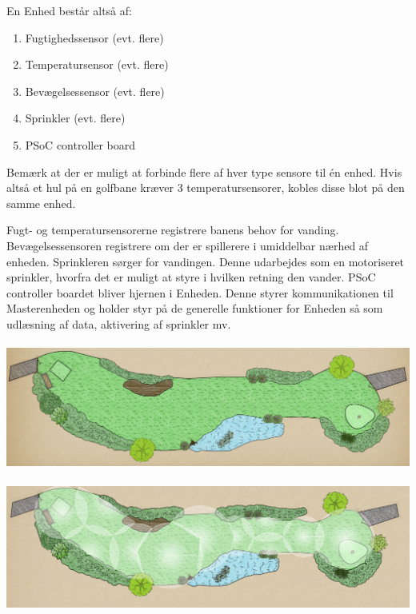 En Enhed består altså af:
\begin{enumerate}
\item Fugtighedssensor (evt. flere)
\item Temperatursensor (evt. flere)
\item Bevægelsessensor (evt. flere)
\item Sprinkler (evt. flere)
\item PSoC controller board

\end{enumerate}

Bemærk at der er muligt at forbinde flere af hver type sensore til én enhed. Hvis altså et hul på en golfbane kræver 3 temperatursensorer, kobles disse blot på den samme enhed.

Fugt- og temperatursensorerne registrere banens behov for vanding. Bevægelsessensoren registrere om der er spillerere i umiddelbar nærhed af enheden. Sprinkleren sørger for vandingen. Denne udarbejdes som en motoriseret sprinkler, hvorfra det er muligt at styre i hvilken retning den vander.
PSoC controller boardet bliver hjernen i Enheden. Denne styrer kommunikationen til Masterenheden og holder styr på de generelle funktioner for Enheden så som udlæsning af data, aktivering af sprinkler mv.


{\includegraphics[height=4.2cm]{filer/indledning/billeder/hul_uden_sprinkler}}

{\includegraphics[height=4.1cm]{filer/indledning/billeder/hul_med_sprinkler}}